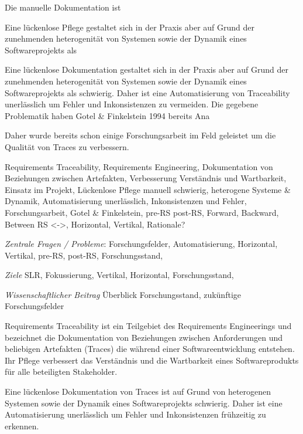 Die manuelle Dokumentation ist 


Eine lückenlose Pflege gestaltet sich in der Praxis aber auf Grund der zunehmenden heterogenität von Systemen sowie der Dynamik eines Softwareprojekts als 

Eine lückenlose Dokumentation gestaltet sich in der Praxis aber auf Grund der zunehmenden heterogenität von Systemen sowie der Dynamik eines Softwareprojekts als schwierig. Daher ist eine Automatisierung von Traceability unerlässlich um Fehler und Inkonsistenzen zu vermeiden. Die gegebene Problematik haben Gotel & Finkelstein 1994 bereits Ana


Daher wurde bereits schon einige Forschungsarbeit im Feld geleistet um die Qualität von Traces zu verbessern.





Requirements Traceability, Requirements Engineering, Dokumentation von Beziehungen zwischen Artefakten, Verbesserung Verständnis und Wartbarkeit, Einsatz im Projekt, Lückenlose Pflege manuell schwierig, heterogene Systeme & Dynamik, Automatisierung unerlässlich, Inkonsistenzen und Fehler, Forschungsarbeit, Gotel & Finkelstein, pre-RS post-RS, Forward, Backward, Between RS <->,  Horizontal, Vertikal, Rationale?

\textit{Zentrale Fragen / Probleme}:
Forschungsfelder, Automatisierung, Horizontal, Vertikal, pre-RS, post-RS, Forschungsstand,

\textit{Ziele}
SLR, Fokussierung, Vertikal, Horizontal, Forschungsstand, 

\textit{Wissenschaftlicher Beitrag}
Überblick Forschungsstand, zukünftige Forschungsfelder
















Requirements Traceability ist ein Teilgebiet des Requirements Engineerings und bezeichnet die Dokumentation von Beziehungen zwischen Anforderungen und beliebigen Artefakten (Traces) die während einer Softwareentwicklung entstehen. Ihr Pflege verbessert das Verständnis und die Wartbarkeit eines Softwareprodukts für alle beteiligten Stakeholder.

Eine lückenlose Dokumentation von Traces ist auf Grund von heterogenen Systemen sowie der Dynamik eines Softwareprojekts schwierig. Daher ist eine Automatisierung unerlässlich um Fehler und Inkonsistenzen frühzeitig zu erkennen. 

